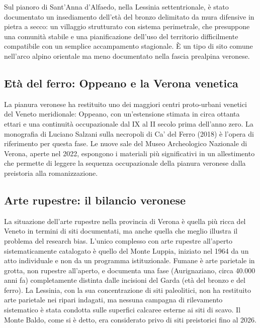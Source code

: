 Sul pianoro di Sant'Anna d'Alfaedo, nella Lessinia settentrionale, è stato documentato un insediamento dell'età del bronzo delimitato da mura difensive in pietra a secco: un villaggio strutturato con sistema perimetrale, che presuppone una comunità stabile e una pianificazione dell'uso del territorio difficilmente compatibile con un semplice accampamento stagionale. È un tipo di sito comune nell'arco alpino orientale ma meno documentato nella fascia prealpina veronese.

\subsection{Età del ferro: Oppeano e la Verona venetica}

La pianura veronese ha restituito uno dei maggiori centri proto-urbani venetici del Veneto meridionale: Oppeano, con un'estensione stimata in circa ottanta ettari e una continuità occupazionale dal IX al II secolo prima dell'anno zero. La monografia di Luciano Salzani sulla necropoli di Ca' del Ferro (2018) è l'opera di riferimento per questa fase. Le nuove sale del Museo Archeologico Nazionale di Verona, aperte nel 2022, espongono i materiali più significativi in un allestimento che permette di leggere la sequenza occupazionale della pianura veronese dalla preistoria alla romanizzazione.

\subsection{Arte rupestre: il bilancio veronese}

La situazione dell'arte rupestre nella provincia di Verona è quella più ricca del Veneto in termini di siti documentati, ma anche quella che meglio illustra il problema del research bias. L'unico complesso con arte rupestre all'aperto sistematicamente catalogato è quello del Monte Luppia, iniziato nel 1964 da un atto individuale e non da un programma istituzionale. Fumane è arte parietale in grotta, non rupestre all'aperto, e documenta una fase (Aurignaziano, circa 40.000 anni fa) completamente distinta dalle incisioni del Garda (età del bronzo e del ferro). La Lessinia, con la sua concentrazione di siti paleolitici, non ha restituito arte parietale nei ripari indagati, ma nessuna campagna di rilevamento sistematico è stata condotta sulle superfici calcaree esterne ai siti di scavo. Il Monte Baldo, come si è detto, era considerato privo di siti preistorici fino al 2026.

